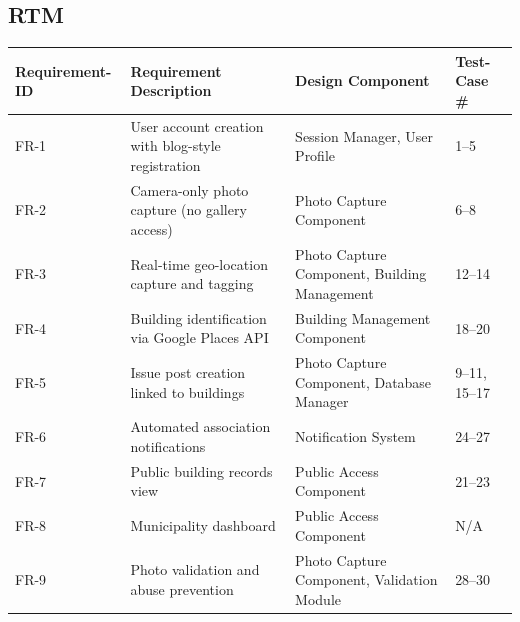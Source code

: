 \documentclass[12pt]{article}
\begin{document}
\subsection{RTM}

\begin{tabular}{|p{3cm}|p{6cm}|p{4cm}|p{3cm}|}
\hline
\textbf{Requirement-ID} & \textbf{Requirement Description} & \textbf{Design Component} & \textbf{Test-Case \#} \\
\hline
FR-1 & User account creation with blog-style registration & Session Manager, User Profile & 1--5 \\
\hline
FR-2 & Camera-only photo capture (no gallery access) & Photo Capture Component & 6--8 \\
\hline
FR-3 & Real-time geo-location capture and tagging & Photo Capture Component, Building Management & 12--14 \\
\hline
FR-4 & Building identification via Google Places API & Building Management Component & 18--20 \\
\hline
FR-5 & Issue post creation linked to buildings & Photo Capture Component, Database Manager & 9--11, 15--17 \\
\hline
FR-6 & Automated association notifications & Notification System & 24--27 \\
\hline
FR-7 & Public building records view & Public Access Component & 21--23 \\
\hline
FR-8 & Municipality dashboard & Public Access Component & N/A \\
\hline
FR-9 & Photo validation and abuse prevention & Photo Capture Component, Validation Module & 28--30 \\
\hline
\end{tabular}

\newpage
\end{document}
